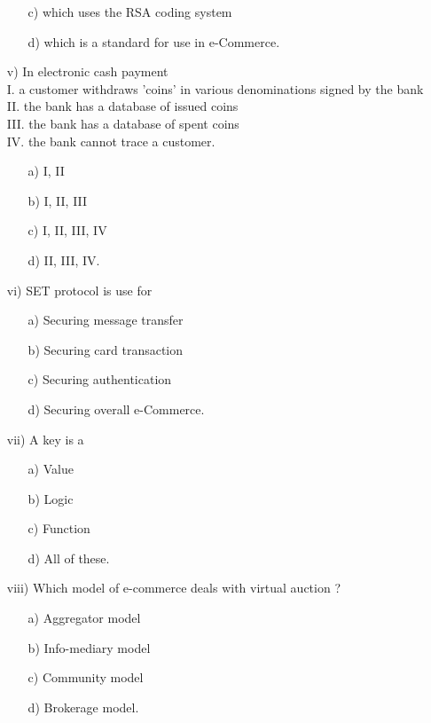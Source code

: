 \documentclass{article}
\begin{document}
\begin{enumerate}
\begin{enumerate}
        \item[c)] which uses the RSA coding system
        \item[d)] which is a standard for use in e-Commerce.
    \end{enumerate}
    \item[v)] In electronic cash payment \\
    I. a customer withdraws 'coins' in various denominations signed by the bank \\
    II. the bank has a database of issued coins \\
    III. the bank has a database of spent coins \\
    IV. the bank cannot trace a customer.
    \begin{enumerate}
        \item[a)] I, II
        \item[b)] I, II, III
        \item[c)] I, II, III, IV
        \item[d)] II, III, IV.
    \end{enumerate}
    \item[vi)] SET protocol is use for
    \begin{enumerate}
        \item[a)] Securing message transfer
        \item[b)] Securing card transaction
        \item[c)] Securing authentication
        \item[d)] Securing overall e-Commerce.
    \end{enumerate}
    \item[vii)] A key is a
    \begin{enumerate}
        \item[a)] Value
        \item[b)] Logic
        \item[c)] Function
        \item[d)] All of these.
    \end{enumerate}
    \item[viii)] Which model of e-commerce deals with virtual auction ?
    \begin{enumerate}
        \item[a)] Aggregator model
        \item[b)] Info-mediary model
        \item[c)] Community model
        \item[d)] Brokerage model.
    \end{enumerate}

\end{enumerate}
\end{document}
